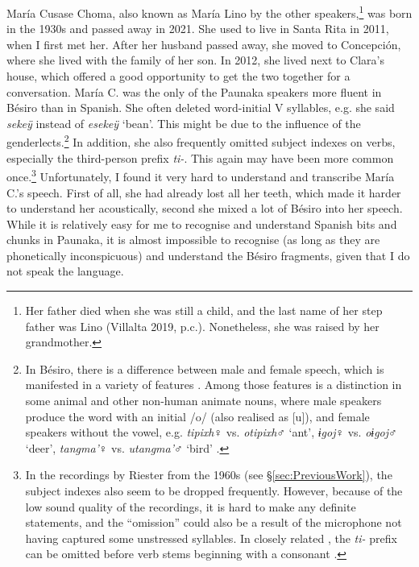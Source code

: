 María Cusase Choma, also known as María Lino by the other speakers,\footnote{Her father died when she was still a child, and the last name of her step father was Lino (Villalta 2019, p.c.). Nonetheless, she was raised by her grandmother.} was born in the 1930s and passed away in 2021. She used to live in Santa Rita in 2011, when I first met her. After her husband passed away, she moved to Concepción, where she lived with the family of her son. In 2012, she lived next to Clara’s house, which offered a good opportunity to get the two together for a conversation. María C. was the only of the Paunaka speakers more fluent in Bésiro than in Spanish. She often deleted word-initial V syllables, e.g. she said \textit{sekeÿ} instead of \textit{esekeÿ} ‘bean’. This might be due to the influence of the  genderlects.\footnote{In Bésiro, there is a difference between male and female speech, which is manifested in a variety of features \citep[cf.][]{Nikulin2019a}. Among those features is a distinction in some animal and other non-human animate nouns, where male speakers produce the word with an initial /o/ (also realised as [u]), and female speakers without the vowel, e.g. \textit{tipixh}♀︎ vs. \textit{otipixh}♂︎ ‘ant’, \textit{ɨgoj}♀︎ vs. \textit{oɨgoj}♂︎ ‘deer’, \textit{tangma’}♀︎ vs. \textit{utangma’}♂︎ ‘bird’ \citep[94--95]{Nikulin2019a}.} In addition, she also frequently omitted subject indexes on verbs, especially the third-person prefix \textit{ti-}. This again may have been more common once.\footnote{In the recordings by Riester from the 1960s (see §\ref{sec:PreviousWork}), the subject indexes also seem to be dropped frequently. However, because of the low sound quality of the recordings, it is hard to make any definite statements, and the “omission” could also be a result of the microphone not having captured some unstressed syllables. In closely related , the \textit{ti-} prefix can be omitted before verb stems beginning with a consonant \citep[482]{OlzaZubiri2004}.} Unfortunately, I found it very hard to understand and transcribe María C.’s speech. First of all, she had already lost all her teeth, which made it harder to understand her acoustically, second she mixed a lot of Bésiro into her speech. While it is relatively easy for me to recognise and understand Spanish bits and chunks in Paunaka, it is almost impossible to recognise (as long as they are phonetically inconspicuous) and understand the Bésiro fragments, given that I do not speak the language.

